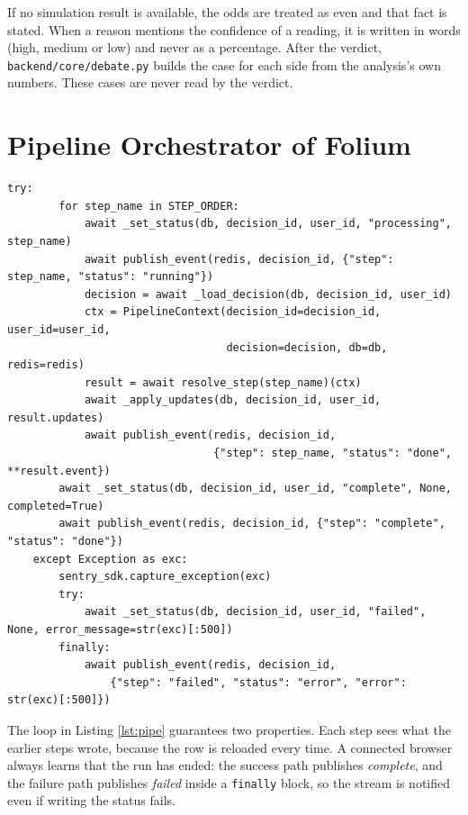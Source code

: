 If no simulation result is available, the odds are treated as even and that fact is stated. When a reason mentions the confidence of a reading, it is written in words (high, medium or low) and never as a percentage. After the verdict, \texttt{backend/core/debate.py} builds the case for each side from the analysis's own numbers. These cases are never read by the verdict.

\section{Pipeline Orchestrator of Folium}
\begin{lstlisting}[caption={The step loop and failure handling (excerpt of \texttt{run\_analysis\_pipeline})}, label=lst:pipe]
    try:
        for step_name in STEP_ORDER:
            await _set_status(db, decision_id, user_id, "processing", step_name)
            await publish_event(redis, decision_id, {"step": step_name, "status": "running"})
            decision = await _load_decision(db, decision_id, user_id)
            ctx = PipelineContext(decision_id=decision_id, user_id=user_id,
                                  decision=decision, db=db, redis=redis)
            result = await resolve_step(step_name)(ctx)
            await _apply_updates(db, decision_id, user_id, result.updates)
            await publish_event(redis, decision_id,
                                {"step": step_name, "status": "done", **result.event})
        await _set_status(db, decision_id, user_id, "complete", None, completed=True)
        await publish_event(redis, decision_id, {"step": "complete", "status": "done"})
    except Exception as exc:
        sentry_sdk.capture_exception(exc)
        try:
            await _set_status(db, decision_id, user_id, "failed", None, error_message=str(exc)[:500])
        finally:
            await publish_event(redis, decision_id,
                {"step": "failed", "status": "error", "error": str(exc)[:500]})
\end{lstlisting}

The loop in Listing \ref{lst:pipe} guarantees two properties. Each step sees what the earlier steps wrote, because the row is reloaded every time. A connected browser always learns that the run has ended: the success path publishes \emph{complete}, and the failure path publishes \emph{failed} inside a \texttt{finally} block, so the stream is notified even if writing the status fails.

